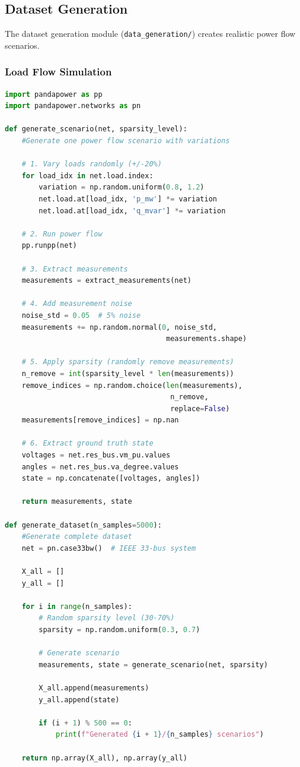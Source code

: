 \documentclass[12pt,a4paper]{report}
\begin{document}
\subsection{Dataset Generation}

The dataset generation module (\texttt{data\_generation/}) creates realistic power flow scenarios.

\subsubsection{Load Flow Simulation}

\begin{lstlisting}[language=Python, caption={Power Flow Scenario Generation}]
import pandapower as pp
import pandapower.networks as pn

def generate_scenario(net, sparsity_level):
    #Generate one power flow scenario with variations
    
    # 1. Vary loads randomly (+/-20%)
    for load_idx in net.load.index:
        variation = np.random.uniform(0.8, 1.2)
        net.load.at[load_idx, 'p_mw'] *= variation
        net.load.at[load_idx, 'q_mvar'] *= variation
    
    # 2. Run power flow
    pp.runpp(net)
    
    # 3. Extract measurements
    measurements = extract_measurements(net)
    
    # 4. Add measurement noise
    noise_std = 0.05  # 5% noise
    measurements += np.random.normal(0, noise_std, 
                                      measurements.shape)
    
    # 5. Apply sparsity (randomly remove measurements)
    n_remove = int(sparsity_level * len(measurements))
    remove_indices = np.random.choice(len(measurements), 
                                       n_remove, 
                                       replace=False)
    measurements[remove_indices] = np.nan
    
    # 6. Extract ground truth state
    voltages = net.res_bus.vm_pu.values
    angles = net.res_bus.va_degree.values
    state = np.concatenate([voltages, angles])
    
    return measurements, state

def generate_dataset(n_samples=5000):
    #Generate complete dataset
    net = pn.case33bw()  # IEEE 33-bus system
    
    X_all = []
    y_all = []
    
    for i in range(n_samples):
        # Random sparsity level (30-70%)
        sparsity = np.random.uniform(0.3, 0.7)
        
        # Generate scenario
        measurements, state = generate_scenario(net, sparsity)
        
        X_all.append(measurements)
        y_all.append(state)
        
        if (i + 1) % 500 == 0:
            print(f"Generated {i + 1}/{n_samples} scenarios")
    
    return np.array(X_all), np.array(y_all)
\end{lstlisting}
\end{document}
